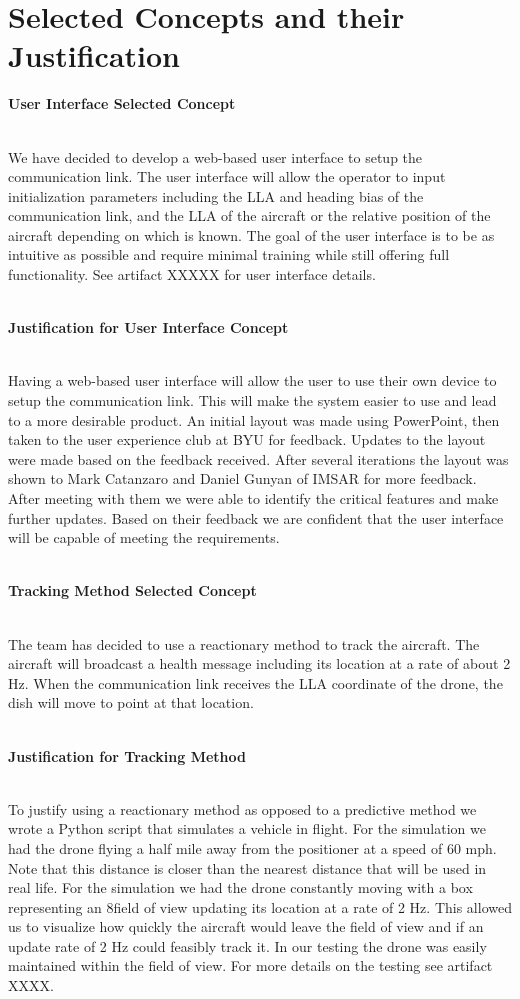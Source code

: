 \chapter{Selected Concepts and their Justification}

\textbf{User Interface Selected Concept} 

~\\
We have decided to develop a web-based user interface to setup the communication link. The user interface will allow the operator to input initialization parameters including the LLA and heading bias of the communication link, and the LLA of the aircraft or the relative position of the aircraft depending on which is known. The goal of the user interface is to be as intuitive as possible and require minimal training while still offering full functionality. See artifact XXXXX for user interface details. 

~\\

\textbf{Justification for User Interface Concept} 

 ~\\
Having a web-based user interface will allow the user to use their own device to setup the communication link. This will make the system easier to use and lead to a more desirable product. An initial layout was made using PowerPoint, then taken to the user experience club at BYU for feedback. Updates to the layout were made based on the feedback received. After several iterations the layout was shown to Mark Catanzaro and Daniel Gunyan of IMSAR for more feedback. After meeting with them we were able to identify the critical features and make further updates. Based on their feedback we are confident that the user interface will be capable of meeting the requirements.

~\\
\textbf{Tracking Method Selected Concept} 

 ~\\
The team has decided to use a reactionary method to track the aircraft. The aircraft will broadcast a health message including its location at a rate of about 2 Hz. When the communication link receives the LLA coordinate of the drone, the dish will move to point at that location.  

~\\
\textbf{Justification for Tracking Method} 

 ~\\
To justify using a reactionary method as opposed to a predictive method we wrote a Python script that simulates a vehicle in flight. For the simulation we had the drone flying a half mile away from the positioner at a speed of 60 mph. Note that this distance is closer than the nearest distance that will be used in real life. For the simulation we had the drone constantly moving with a box representing an 8\degree field of view updating its location at a rate of 2 Hz. This allowed us to visualize how quickly the aircraft would leave the field of view and if an update rate of 2 Hz could feasibly track it. In our testing the drone was easily maintained within the field of view. For more details on the testing see artifact XXXX.  

